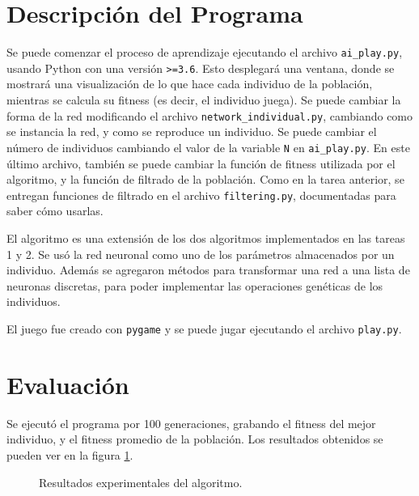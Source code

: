 \documentclass[letterpaper,11pt]{article} %
\begin{document}
\section{Descripción del Programa}
  Se puede comenzar el proceso de aprendizaje ejecutando el archivo \texttt{ai\_play.py}, usando Python con una versión \texttt{>=3.6}. Esto desplegará una ventana, donde se mostrará una visualización de lo que hace cada individuo de la población, mientras se calcula su fitness (es decir, el individuo juega). Se puede cambiar la forma de la red modificando el archivo \texttt{network\_individual.py}, cambiando como se instancia la red, y como se reproduce un individuo. Se puede cambiar el número de individuos cambiando el valor de la variable \texttt{N} en \texttt{ai\_play.py}. En este último archivo, también se puede cambiar la función de fitness utilizada por el algoritmo, y la función de filtrado de la población. Como en la tarea anterior, se entregan funciones de filtrado en el archivo \texttt{filtering.py}, documentadas para saber cómo usarlas.
  
  El algoritmo es una extensión de los dos algoritmos implementados en las tareas 1 y 2. Se usó la red neuronal como uno de los parámetros almacenados por un individuo. Además se agregaron métodos para transformar una red a una lista de neuronas discretas, para poder implementar las operaciones genéticas de los individuos.
  
  El juego fue creado con \texttt{pygame} y se puede jugar ejecutando el archivo \texttt{play.py}.

\section{Evaluación}
  Se ejecutó el programa por 100 generaciones, grabando el fitness del mejor individuo, y el fitness promedio de la población. Los resultados obtenidos se pueden ver en la figura \ref{populationfitness}. 

  \begin{figure}
    \centering
    \hspace{0.5cm}
    \caption{Resultados experimentales del algoritmo.}
    \label{populationfitness}
  \end{figure}
\end{document}
